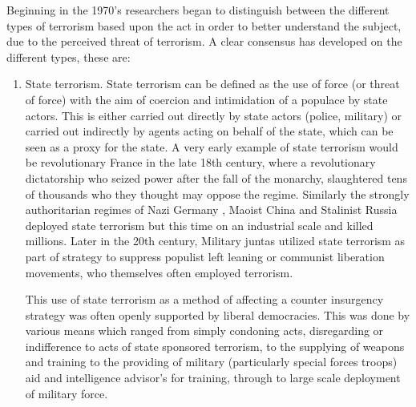 Beginning in the 1970's researchers began to distinguish between the different types of terrorism based upon the act in order to better understand the subject, due to the perceived threat of terrorism. A clear consensus has developed on the different types, these are:
\begin{enumerate}
\item State terrorism. State terrorism can be defined as the use of force (or threat of force) with the aim of coercion and intimidation of a populace by state actors. This is either carried out directly by state actors (police, military) or carried out indirectly by agents acting on behalf of the state, which can be seen as a proxy for the state. A very early example of state terrorism would be revolutionary France in the late 18th century, where a revolutionary dictatorship who seized power after the fall of the monarchy, slaughtered tens of thousands who they thought may oppose the regime. Similarly the strongly authoritarian regimes of Nazi Germany \citep{gibbs1989conceptualization}, Maoist China and Stalinist Russia \citep{blakeley2009state} deployed state terrorism but this time on an industrial scale and killed millions. Later in the 20th century, Military juntas utilized  state terrorism as part of strategy to suppress populist left leaning or communist liberation movements, who themselves often employed terrorism. 

This use of state terrorism as a method of affecting a counter insurgency strategy was often openly supported by liberal democracies. This was done by various means which ranged from simply condoning acts, disregarding or indifference to acts of state sponsored terrorism, to the supplying of weapons and training to the providing of military (particularly special forces troops) aid and intelligence advisor's for training, through to large scale deployment of military force. 


\end{enumerate}
